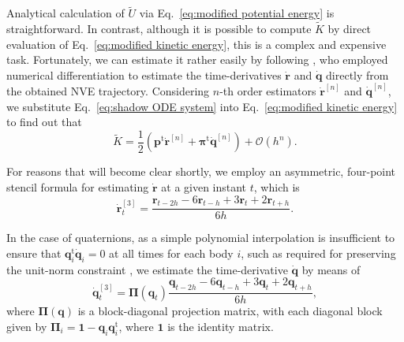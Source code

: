 \documentclass[
journal=jctcce,
layout=twocolumn
]{achemso}
\newcommand{\mt}[1]{\boldsymbol{\mathbf{#1}}}   %
\newcommand{\vt}[1]{\boldsymbol{\mathbf{#1}}}   %
\newcommand{\tr}[1]{#1^\text{t}}                %
\newcommand{\timestep}{h}
\newcommand{\refined}[1]{\widetilde{#1}}
\begin{document}
Analytical calculation of $\refined U$ via Eq.~\eqref{eq:modified potential energy} is straightforward.
In contrast, although it is possible to compute $\refined K$ by direct evaluation of Eq.~\eqref{eq:modified kinetic energy}, this is a complex and expensive task.
Fortunately, we can estimate it rather easily by following \citeauthor{Eastwood_2010} \cite{Eastwood_2010}, who employed numerical differentiation to estimate the time-derivatives $\dot{\vt r}$ and $\dot{\vt q}$ directly from the obtained NVE trajectory.
Considering $n$-th order estimators $\dot{\vt r}^{[n]}$ and $\dot{\vt q}^{[n]}$, we substitute Eq.~\eqref{eq:shadow ODE system} into Eq.~\eqref{eq:modified kinetic energy} to find out that
\begin{equation}
\label{eq:modified kinetic energy estimator}
\refined K = \frac{1}{2} \left( \tr{\vt p} \dot{\vt r}^{[n]} + \tr{\vt \pi} \dot{\vt q}^{[n]} \right) + \mathcal{O}(\timestep^n).
\end{equation}

For reasons that will become clear shortly, we employ an asymmetric, four-point stencil formula for estimating $\dot{\vt r}$ at a given instant $t$, which is
\begin{equation*}
\dot{\vt r}^{[3]}_t = \frac{{\vt r}_{t-2\timestep} - 6 {\vt r}_{t-\timestep} + 3 {\vt r}_t + 2 {\vt r}_{t+\timestep}}{6\timestep}.
\end{equation*}

In the case of quaternions, as a simple polynomial interpolation is insufficient to ensure that $\tr{\vt q}_i \dot{\vt q}_i = 0$ at all times for each body $i$, such as required for preserving the unit-norm constraint \cite{Silveira_2017}, we estimate the time-derivative $\dot{\vt q}$ by means of \cite{Schay_1995}
\begin{equation*}
\dot{\vt q}^{[3]}_t = {\mt \Pi}({\vt q}_t) \frac{{\vt q}_{t-2\timestep} - 6 {\vt q}_{t-\timestep} + 3 {\vt q}_t + 2 {\vt q}_{t+\timestep}}{6\timestep},
\end{equation*}
where ${\mt \Pi}(\vt q)$ is a block-diagonal projection matrix, with each diagonal block given by ${\mt \Pi}_i = {\mt 1} - {\vt q}_i \tr{\vt q}_i$, where $\mt 1$ is the identity matrix.
\end{document}
